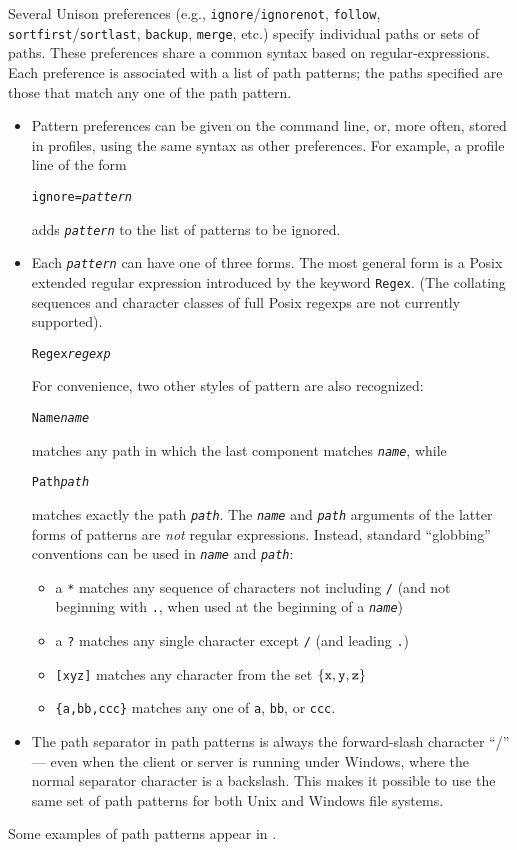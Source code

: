 \documentclass{article}
\newcommand{\ARG}[1]{\texttt{\textit{#1}}}
\begin{document}
Several Unison preferences (e.g., \verb|ignore|/\verb|ignorenot|,
\verb|follow|, \verb|sortfirst|/\verb|sortlast|, \verb|backup|,
\verb|merge|, etc.)
specify individual paths or sets of paths.  These preferences share a
common syntax based on regular-expressions.  Each preference
is associated with a list of path patterns; the paths specified are those
that match any one of the path pattern.

\begin{itemize}
\item Pattern preferences can be given on the command line,
  or, more often, stored in profiles, using the same syntax as other preferences.  
  For example, a profile line of the form
\begin{alltt}
             ignore = \ARG{pattern}
\end{alltt}
adds \ARG{pattern} to the list of patterns to be ignored.

\item Each \ARG{pattern} can have one of three forms.  The most
general form is a Posix extended regular expression introduced by the
keyword \verb|Regex|.  (The collating sequences and character classes of
full Posix regexps are not currently supported).
\begin{alltt}
                 Regex \ARG{regexp}
\end{alltt}
For convenience, two other styles of pattern are also recognized:
\begin{alltt}
                 Name \ARG{name}
\end{alltt}
matches any path in which the last component matches \ARG{name}, while
\begin{alltt}
                 Path \ARG{path}
\end{alltt}
matches exactly the path \ARG{path}.
%
The \ARG{name} and \ARG{path} arguments of the latter forms of
patterns are {\em not} regular expressions.  Instead, 
standard ``globbing'' conventions can be used in \ARG{name} and
\ARG{path}:  
\begin{itemize}
\item a \verb|*| matches any sequence of characters not including \verb|/|
(and not beginning with \verb|.|, when used at the beginning of a
\ARG{name})
\item a \verb|?| matches any single character except \verb|/| (and leading
  \verb|.|) 
\item \verb|[xyz]| matches any character from the set $\{{\tt x},
  {\tt y}, {\tt z} \}$
\item \verb|{a,bb,ccc}| matches any one of \verb|a|, \verb|bb|, or
  \verb|ccc|. 
\end{itemize}
\item 
The path separator in path patterns is always the
forward-slash character ``/'' --- even when the client or server is
running under Windows, where the normal separator character is a
backslash.  This makes it possible to use the same set of path
patterns for both Unix and Windows file systems.  
\end{itemize}
Some examples of path patterns appear in .
\end{document}
